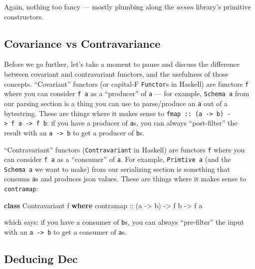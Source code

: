 \documentclass[]{article}
\newenvironment{Shaded}{}{}
\newcommand{\DataTypeTok}[1]{\textcolor[rgb]{0.56,0.13,0.00}{#1}}
\newcommand{\KeywordTok}[1]{\textcolor[rgb]{0.00,0.44,0.13}{\textbf{#1}}}
\newcommand{\NormalTok}[1]{#1}
\newcommand{\OtherTok}[1]{\textcolor[rgb]{0.00,0.44,0.13}{#1}}
\begin{document}
Again, nothing too fancy --- mostly plumbing along the \emph{aeson} library's
primitive constructors.

\subsection{Covariance vs Contravariance}\label{covariance-vs-contravariance}

Before we go further, let's take a moment to pause and discuss the difference
between covariant and contravariant functors, and the usefulness of those
concepts. ``Covariant'' functors (or capital-F \texttt{Functor}s in Haskell) are
functors \texttt{f} where you can consider \texttt{f\ a} as a ``producer'' of
\texttt{a} --- for example, \texttt{Schema\ a} from our parsing section is a
thing you can use to parse/produce an \texttt{a} out of a bytestring. These are
things where it makes sense to
\texttt{fmap\ ::\ (a\ -\textgreater{}\ b)\ -\textgreater{}\ f\ a\ -\textgreater{}\ f\ b}:
if you have a producer of \texttt{a}s, you can always ``post-filter'' the result
with an \texttt{a\ -\textgreater{}\ b} to get a producer of \texttt{b}s.

``Contravariant'' functors (\texttt{Contravariant} in Haskell) are functors
\texttt{f} where you can consider \texttt{f\ a} as a ``consumer'' of \texttt{a}.
For example, \texttt{Primtive\ a} (and the \texttt{Schema\ a} we want to make)
from our serializing section is something that consums \texttt{a}s and produces
json values. These are things where it makes sense to \texttt{contramap}:

\begin{Shaded}
\begin{Highlighting}[]
\KeywordTok{class} \DataTypeTok{Contravariant}\NormalTok{ f }\KeywordTok{where}
\OtherTok{    contramap ::}\NormalTok{ (a }\OtherTok{{-}\textgreater{}}\NormalTok{ b) }\OtherTok{{-}\textgreater{}}\NormalTok{ f b }\OtherTok{{-}\textgreater{}}\NormalTok{ f a}
\end{Highlighting}
\end{Shaded}

which says: if you have a consumer of \texttt{b}s, you can always ``pre-filter''
the input with an \texttt{a\ -\textgreater{}\ b} to get a consumer of
\texttt{a}s.

\subsection{Deducing Dec}\label{deducing-dec}
\end{document}
